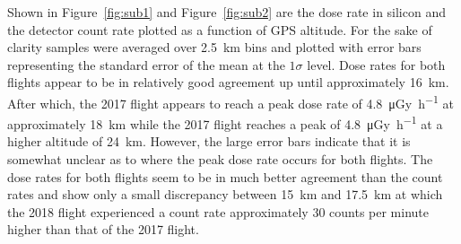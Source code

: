 Shown in Figure~\ref{fig:sub1} and Figure~\ref{fig:sub2} are the dose rate in silicon and the detector count rate plotted as a function of GPS altitude. For the sake of clarity samples were averaged over \SI{2.5}{\kilo\meter} bins and plotted with error bars representing the standard error of the mean at the $1\sigma$ level. Dose rates for both flights appear to be in relatively good agreement up until approximately \SI{16}{\kilo\meter}. After which, the 2017 flight appears to reach a peak dose rate of \SI{4.8}{\micro\gray\per\hour} at approximately \SI{18}{\kilo\meter} while the 2017 flight reaches a peak of \SI{4.8}{\micro\gray\per\hour} at a higher altitude of \SI{24}{\kilo\meter}. 
%
However, the large error bars indicate that it is somewhat unclear as to where the peak dose rate occurs for both flights. %
%
The dose rates for both flights seem to be in much better agreement than the count rates and show only a small discrepancy between \SI{15}{\kilo\meter} and \SI{17.5}{\kilo\meter} at which the 2018 flight experienced a count rate approximately 30 counts per minute higher than that of the 2017 flight. %
